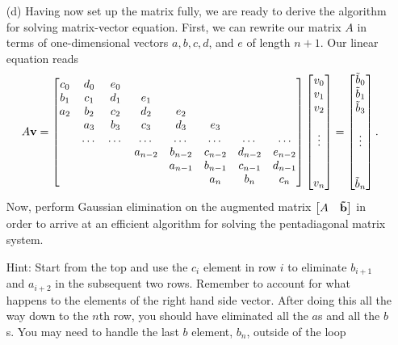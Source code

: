 \documentclass[11pt,a4wide]{article}
\begin{document}
\begin{itemize}
\item[(d)] Having now set up the matrix fully, we are ready to derive the algorithm for solving matrix-vector equation. First, we can rewrite our matrix $A$ in terms of one-dimensional vectors $a, b, c, d$, and $e$ of length $n+1$. Our linear equation reads
\begin{align}
A{\bf v}=\begin{bmatrix}
                       c_0 & d_0  & e_0  & & & &\\
                       b_1 & c_1 & d_1  & e_1  & & & &\\
                       a_2 &  b_2 & c_2 & d_2  & e_2  & & &\\
                       & a_3  & b_3  & c_3 & d_3 & e_3 & &\\
                       & \dots    &  \dots   &  \dots   &  \dots &\dots  &\dots  & \dots\\
                       &     &     & a_{n-2}  & b_{n-2} &  c_{n-2} & d_{n-2} & e_{n-2} \\
                       &     &     &     & a_{n-1}  & b_{n-1} &  c_{n-1} & d_{n-1} \\
                       &     &     &     &     &  a_n & b_n &  c_n \end{bmatrix} 
\begin{bmatrix}v_0 \\ v_1 \\ v_2 \\ \\ \vdots \\ \\ \\ v_n\end{bmatrix} = 
\begin{bmatrix}\tilde{b}_0 \\ \tilde{b}_1 \\ \tilde{b}_3 \\ \\ \vdots \\ \\ \\ \tilde{b}_n \end{bmatrix}.
\end{align}
Now, perform Gaussian elimination on the augmented matrix $\begin{bmatrix}A & {\bf \tilde{b}}\end{bmatrix}$ in order to arrive at an efficient algorithm for solving the pentadiagonal matrix system. 

Hint: Start from the top and use the $c_i$ element in row $i$ to eliminate $b_{i+1}$ and $a_{i+2}$ in the subsequent two rows. Remember to account for what happens to the elements of the right hand side vector. After doing this all the way down to the $n$th row, you should have eliminated all the $a$s and all the $b$s. You may need to handle the last $b$ element, $b_n$, outside of the loop


\end{itemize}
\end{document}
